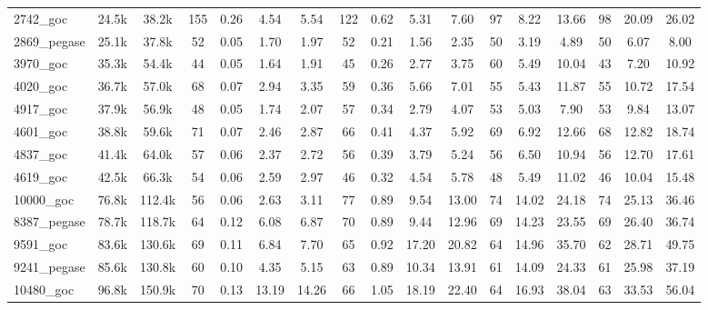 \begin{tabular}{|l|c|c|cccc|cccc|ccc|ccc|}
2742\_goc 
&  24.5k
&  38.2k
& 155 
&  0.26
&  4.54
&  5.54
& 122 
&  0.62
&  5.31
&  7.60
& 97 
&  8.22
& 13.66
& 98 
& 20.09
& 26.02
\\

2869\_pegase 
&  25.1k
&  37.8k
& 52 
&  0.05
&  1.70
&  1.97
& 52 
&  0.21
&  1.56
&  2.35
& 50 
&  3.19
&  4.89
& 50 
&  6.07
&  8.00
\\
\hline
3970\_goc 
&  35.3k
&  54.4k
& 44 
&  0.05
&  1.64
&  1.91
& 45 
&  0.26
&  2.77
&  3.75
& 60 
&  5.49
& 10.04
& 43 
&  7.20
& 10.92
\\

4020\_goc 
&  36.7k
&  57.0k
& 68 
&  0.07
&  2.94
&  3.35
& 59 
&  0.36
&  5.66
&  7.01
& 55 
&  5.43
& 11.87
& 55 
& 10.72
& 17.54
\\

4917\_goc 
&  37.9k
&  56.9k
& 48 
&  0.05
&  1.74
&  2.07
& 57 
&  0.34
&  2.79
&  4.07
& 53 
&  5.03
&  7.90
& 53 
&  9.84
& 13.07
\\

4601\_goc 
&  38.8k
&  59.6k
& 71 
&  0.07
&  2.46
&  2.87
& 66 
&  0.41
&  4.37
&  5.92
& 69 
&  6.92
& 12.66
& 68 
& 12.82
& 18.74
\\

4837\_goc 
&  41.4k
&  64.0k
& 57 
&  0.06
&  2.37
&  2.72
& 56 
&  0.39
&  3.79
&  5.24
& 56 
&  6.50
& 10.94
& 56 
& 12.70
& 17.61
\\
\hline
4619\_goc 
&  42.5k
&  66.3k
& 54 
&  0.06
&  2.59
&  2.97
& 46 
&  0.32
&  4.54
&  5.78
& 48 
&  5.49
& 11.02
& 46 
& 10.04
& 15.48
\\

10000\_goc 
&  76.8k
& 112.4k
& 56 
&  0.06
&  2.63
&  3.11
& 77 
&  0.89
&  9.54
& 13.00
& 74 
& 14.02
& 24.18
& 74 
& 25.13
& 36.46
\\

8387\_pegase 
&  78.7k
& 118.7k
& 64 
&  0.12
&  6.08
&  6.87
& 70 
&  0.89
&  9.44
& 12.96
& 69 
& 14.23
& 23.55
& 69 
& 26.40
& 36.74
\\

9591\_goc 
&  83.6k
& 130.6k
& 69 
&  0.11
&  6.84
&  7.70
& 65 
&  0.92
& 17.20
& 20.82
& 64 
& 14.96
& 35.70
& 62 
& 28.71
& 49.75
\\

9241\_pegase 
&  85.6k
& 130.8k
& 60 
&  0.10
&  4.35
&  5.15
& 63 
&  0.89
& 10.34
& 13.91
& 61 
& 14.09
& 24.33
& 61 
& 25.98
& 37.19
\\
\hline
10480\_goc 
&  96.8k
& 150.9k
& 70 
&  0.13
& 13.19
& 14.26
& 66 
&  1.05
& 18.19
& 22.40
& 64 
& 16.93
& 38.04
& 63 
& 33.53
& 56.04
\\


\end{tabular}
